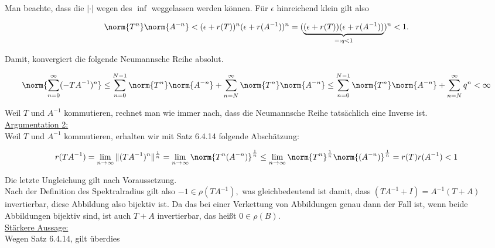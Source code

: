 \begin{solution}
Man beachte, dass die $|\cdot|$ wegen des $\inf$ weggelassen werden können.
Für $\epsilon$ hinreichend klein gilt also

\begin{align*}
  \norm{T^n} \norm{A^{-n}}
  <
  (\epsilon + r(T))^n
  (\epsilon + r(A^{-1}))^n
  =
  (
    \underbrace
    {
      (\epsilon + r(T))
      (\epsilon + r(A^{-1}))
    }_{=: q < 1}
  )^n < 1.
\end{align*}

Damit, konvergiert die folgende Neumannsche Reihe absolut.

\begin{align*}
  \norm{\sum_{n = 0}^\infty (-T A^{-1})^n}
  \leq
  \sum_{n = 0}^{N-1} \norm{T^n} \norm{A^{-n}} +
  \sum_{n = N}^\infty \norm{T^n} \norm{A^{-n}}
  \leq
  \sum_{n = 0}^{N-1} \norm{T^n} \norm{A^{-n}} +
  \sum_{n = N}^\infty q^n
  < \infty
\end{align*}

Weil $T$ und $A^{-1}$ kommutieren, rechnet man wie immer nach, dass die Neumannsche Reihe tatsächlich eine Inverse ist. \\

\underline{Argumentation 2:} \\

Weil $T$ und $A^{-1}$ kommutieren, erhalten wir mit Satz 6.4.14 folgende Abschätzung:

\begin{align*}
    r(TA^{-1})
    =
    \lim_{n \to \infty}{\|(TA^{-1})^n\|^{\frac{1}{n}}}
    =
    \lim_{n \to \infty}
    \norm{T^n(A^{-n})}^\frac{1}{n}
    \leq
    \lim_{n \to \infty}
    \norm{T^n}^\frac{1}{n}
    \norm{(A^{-n})}^\frac{1}{n}
    =
    r(T) r(A^{-1}) < 1
\end{align*}

Die letzte Ungleichung gilt nach Voraussetzung. \\

Nach der Definition des Spektralradius gilt also $-1 \in \rho(TA^{-1}),$ was gleichbedeutend ist damit, dass $(TA^{-1} + I) = A^{-1} (T + A)$ invertierbar, diese Abbildung also bijektiv ist. Da das bei einer Verkettung von Abbildungen genau dann der Fall ist, wenn beide Abbildungen bijektiv sind, ist auch $T + A$ invertierbar, das heißt $0 \in \rho(B).$ \\

\underline{Stärkere Aussage:} \\

Wegen Satz 6.4.14, gilt überdies


\end{solution}
